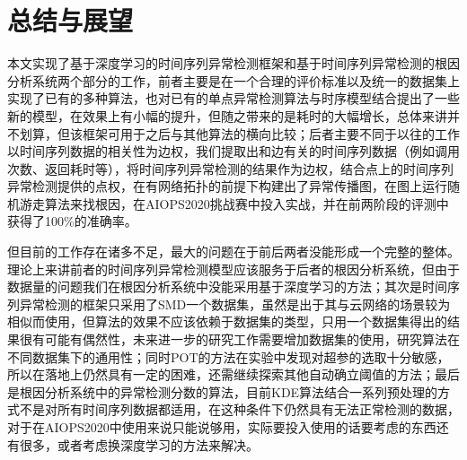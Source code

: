
\chapter{总结与展望}
\label{cha:intro}
本文实现了基于深度学习的时间序列异常检测框架和基于时间序列异常检测的根因分析系统两个部分的工作，前者主要是在一个合理的评价标准以及统一的数据集上实现了已有的多种算法，也对已有的单点异常检测算法与时序模型结合提出了一些新的模型，在效果上有小幅的提升，但随之带来的是耗时的大幅增长，总体来讲并不划算，但该框架可用于之后与其他算法的横向比较；后者主要不同于以往的工作以时间序列数据的相关性为边权，我们提取出和边有关的时间序列数据（例如调用次数、返回耗时等），将时间序列异常检测的结果作为边权，结合点上的时间序列异常检测提供的点权，在有网络拓扑的前提下构建出了异常传播图，在图上运行随机游走算法来找根因，在AIOPS2020挑战赛中投入实战，并在前两阶段的评测中获得了100\%的准确率。

但目前的工作存在诸多不足，最大的问题在于前后两者没能形成一个完整的整体。理论上来讲前者的时间序列异常检测模型应该服务于后者的根因分析系统，但由于数据量的问题我们在根因分析系统中没能采用基于深度学习的方法；其次是时间序列异常检测的框架只采用了SMD一个数据集，虽然是出于其与云网络的场景较为相似而使用，但算法的效果不应该依赖于数据集的类型，只用一个数据集得出的结果很有可能有偶然性，未来进一步的研究工作需要增加数据集的使用，研究算法在不同数据集下的通用性；同时POT的方法在实验中发现对超参的选取十分敏感，所以在落地上仍然具有一定的困难，还需继续探索其他自动确立阈值的方法；最后是根因分析系统中的异常检测分数的算法，目前KDE算法结合一系列预处理的方式不是对所有时间序列数据都适用，在这种条件下仍然具有无法正常检测的数据，对于在AIOPS2020中使用来说只能说够用，实际要投入使用的话要考虑的东西还有很多，或者考虑换深度学习的方法来解决。


